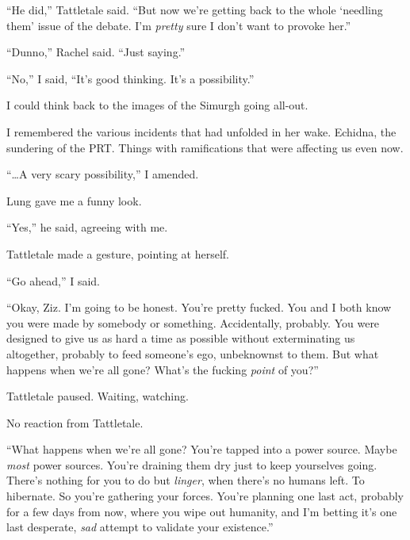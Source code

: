 ``He did,'' Tattletale said.  ``But now we're getting back to the whole `needling them' issue of the debate.  I'm \emph{pretty} sure I don't want to provoke her.''



``Dunno,'' Rachel said.  ``Just saying.''



``No,'' I said, ``It's good thinking.  It's a possibility.''



I could think back to the images of the Simurgh going all-out.



I remembered the various incidents that had unfolded in her wake.  Echidna, the sundering of the PRT.  Things with ramifications that were affecting us even now.



``\ldots{}A very scary possibility,'' I amended.



Lung gave me a funny look.



``Yes,'' he said, agreeing with me.



Tattletale made a gesture, pointing at herself.



``Go ahead,'' I said.



``Okay, Ziz.  I'm going to be honest.  You're pretty fucked.  You and I both know you were made by somebody or something.  Accidentally, probably.  You were designed to give us as hard a time as possible without exterminating us altogether, probably to feed someone's ego, unbeknownst to them.  But what happens when we're all gone?  What's the fucking \emph{point }of you?''



Tattletale paused.  Waiting, watching.



No reaction from Tattletale.



``What happens when we're all gone?  You're tapped into a power source.  Maybe \emph{most} power sources.  You're draining them dry just to keep yourselves going.  There's nothing for you to do but \emph{linger}, when there's no humans left.  To hibernate.  So you're gathering your forces.  You're planning one last act, probably for a few days from now, where you wipe out humanity, and I'm betting it's one last desperate, \emph{sad} attempt to validate your existence.''



